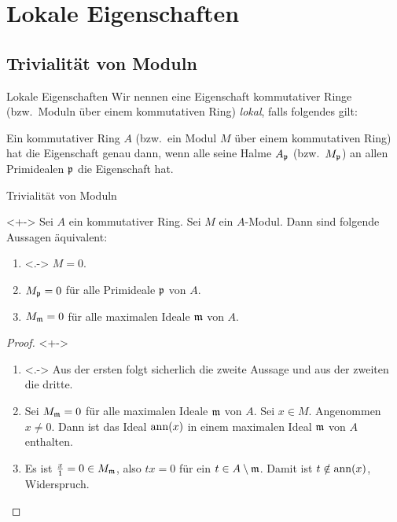 \section{Lokale Eigenschaften}

\subsection{Trivialität von Moduln}

\begin{frame}{Lokale Eigenschaften}
	Wir nennen eine Eigenschaft kommutativer Ringe (bzw.~Moduln über einem kommutativen Ring) \emph{lokal},
	falls folgendes gilt:
	
	Ein kommutativer Ring \(A\) (bzw.~ein Modul \(M\) über einem kommutativen Ring) hat die Eigenschaft genau dann, wenn
	alle seine Halme \(A_{\mathfrak{p}}\) (bzw.~\(M_{\mathfrak{p}}\)) an allen Primidealen \(\mathfrak{p}\) die Eigenschaft hat.
\end{frame}

\begin{frame}{Trivialität von Moduln}
	\begin{proposition}<+->
		Sei \(A\) ein kommutativer Ring. Sei \(M\) ein \(A\)-Modul. Dann sind folgende Aussagen äquivalent:
		\begin{enumerate}[<+->]
		\item<.->
			\(M = 0\).
		\item
			\(M_{\mathfrak{p}} = 0\) für alle Primideale \(\mathfrak{p}\) von \(A\).
		\item
			\(M_{\mathfrak{m}} = 0\) für alle maximalen Ideale \(\mathfrak{m}\) von \(A\).
		\end{enumerate}
	\end{proposition}
	\begin{proof}<+->
		\begin{enumerate}[<+->]
		\item<.->
			Aus der ersten folgt sicherlich die zweite Aussage und aus der zweiten die dritte. 
		\item
			Sei \(M_{\mathfrak{m}} = 0\) für alle maximalen Ideale \(\mathfrak{m}\) von \(A\). Sei \(x \in M\).
			Angenommen \(x \neq 0\).
			Dann ist das Ideal \(\operatorname{ann}(x)\) in einem maximalen Ideal \(\mathfrak{m}\) von
			\(A\) enthalten.
		\item
			Es ist \(\frac x 1 = 0 \in M_{\mathfrak{m}}\), also \(t x = 0\) für ein \(t \in A \setminus \mathfrak{m}\).
			Damit ist \(t \notin \operatorname{ann}(x)\), Widerspruch.
		\qedhere
		\end{enumerate}
	\end{proof}
\end{frame}

